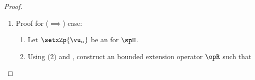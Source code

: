 \begin{proof}
\begin{enumerate}
\begin{enumerate}
\begin{enumerate}
          \item Proof for lower bound $A$:
            \begin{align*}
              \norm{\sum_{n=1}^\infty \alpha_n\vx_n}^2
                &=   \frac{\normop{\opRi}^2}{\normop{\opRi}^2}\,\norm{\sum_{n=1}^\infty \alpha_n\vx_n}^2
                &&   \text{because $\normop{\opRi}>0$}&&\text{\xref{prop:op_norm}}
              \\&\ge \frac{1}{\normop{\opRi}^2}\,\norm{\opRi\sum_{n=1}^\infty \alpha_n\vx_n}^2
                &&   \text{by \prefp{thm:LxLx}}
              \\&=   \frac{1}{\normop{\opRi}^2}\,\norm{\opRi\sum_{n=1}^\infty \alpha_n\opR\vu_n}^2
                &&   \text{by definition of $\opR$}&&\text{\xref{item:rieszAB_R}}
              \\&=   \frac{1}{\normop{\opRi}^2}\,\norm{\opRi\opR\sum_{n=1}^\infty \alpha_n\vu_n}^2
                &&   \text{by property of \structe{linear operator}s}
                &&   \text{\xref{thm:L_prop}}
              \\&=   \frac{1}{\normop{\opRi}^2}\,\norm{\sum_{n=1}^\infty \alpha_n\vu_n}^2
                &&   \text{by definition of inverse op.}
                &&   \text{\ifxref{operator}{def:opI}}
              \\&=   \frac{1}{\normop{\opRi}^2}\,\sum_{n=1}^\infty \norm{\alpha_n\vu_n}^2
                &&   \text{by \thme{Pythagorean Theorem}}
                &&\text{\ifxref{vsinprod}{thm:pythag}}
              \\&=   \frac{1}{\normop{\opRi}^2}\,\sum_{n=1}^\infty \abs{\alpha_n}^2 \norm{\vu_n}^2
                &&   \text{by $\normn$ \prope{homogeneous} prop.}
                &&\text{\xref{def:norm}}
              \\&=   \mcom{\frac{1}{\normop{\opRi}^2}}{$A$}\,\sum_{n=1}^\infty \abs{\alpha_n}^2
                &&   \text{by def. of \prope{orthonormality}}
                &&\text{\xref{def:orthog}}
            \end{align*}
        \end{enumerate}
    \end{enumerate}
  \item Proof for ($\implies$) case:
    \begin{enumerate}
      \item Let $\setxZp{\vu_n}$ be an  for $\spH$.
      \item Using (2) and , construct an bounded extension operator $\opR$ such that

\end{enumerate}
\end{enumerate}
\end{proof}
